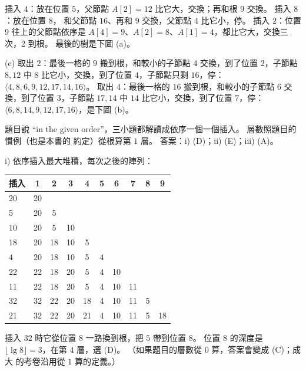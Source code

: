 插入 $4$：放在位置 $5$，父節點 $A[2] = 12$ 比它大，交換；再和根 $9$ 交換。 插入 $8$：放在位置 $8$，
和父節點 $16$、再和 $9$ 交換，父節點 $4$ 比它小，停。 插入 $2$：位置 $9$ 往上的父節點依序是
$A[4] = 9$、$A[2] = 8$、$A[1] = 4$，都比它大，交換三次，$2$ 到根。 最後的樹是下圖 (a)。

(e) 取出 $2$：最後一格的 $9$ 搬到根，和較小的子節點 $4$ 交換，到了位置 $2$，子節點 $8, 12$ 中
$8$ 比它小，交換，到了位置 $4$，子節點只剩 $16$，停：
$\langle 4, 8, 6, 9, 12, 17, 14, 16 \rangle$。 取出 $4$：最後一格的 $16$ 搬到根，和較小的子節點
$6$ 交換，到了位置 $3$，子節點 $17, 14$ 中 $14$ 比它小，交換，到了位置 $7$，停：
$\langle 6, 8, 14, 9, 12, 17, 16 \rangle$，是下圖 (b)。

\begin{center}
\end{center}

題目說 ``in the given order''，三小題都解讀成依序一個一個插入。 層數照題目的慣例（也是本書的
約定）從根算第 $1$ 層。 答案：i) (D)；ii) (E)；iii) (A)。

i) 依序插入最大堆積，每次之後的陣列：
\begin{center}
\small
\begin{tabular}{l*{9}{c}}
\toprule
插入 & 1 & 2 & 3 & 4 & 5 & 6 & 7 & 8 & 9 \\
\midrule
20 & 20 \\
5 & 20 & 5 \\
10 & 20 & 5 & 10 \\
18 & 20 & 18 & 10 & 5 \\
4 & 20 & 18 & 10 & 5 & 4 \\
22 & 22 & 18 & 20 & 5 & 4 & 10 \\
11 & 22 & 18 & 20 & 5 & 4 & 10 & 11 \\
32 & 32 & 22 & 20 & 18 & 4 & 10 & 11 & 5 \\
21 & 32 & 22 & 20 & 21 & 4 & 10 & 11 & 5 & 18 \\
\bottomrule
\end{tabular}
\end{center}
插入 $32$ 時它從位置 $8$ 一路換到根，把 $5$ 帶到位置 $8$。 位置 $8$ 的深度是
$\lfloor \lg 8 \rfloor = 3$，在第 $4$ 層，選 (D)。 （如果題目的層數從 $0$ 算，答案會變成 (C)；成大
的考卷沿用從 $1$ 算的定義。）

